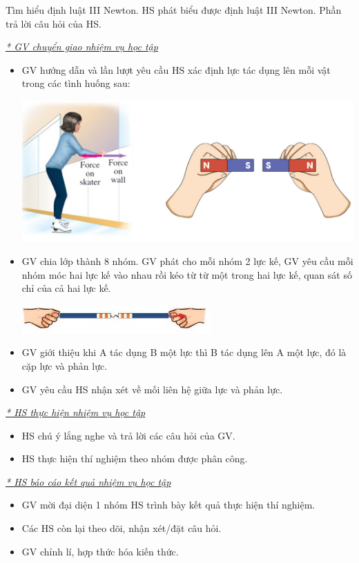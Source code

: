 \hoatdong
{Tìm hiểu định luật III Newton.
}
{HS phát biểu được định luật III Newton.
}
{Phần trả lời câu hỏi của HS.
}
{\textit{\underline{* GV chuyển giao nhiệm vụ học tập}}\\
	\begin{itemize}[label=-]
		\item GV hướng dẫn và lần lượt yêu cầu HS xác định lực tác dụng lên mỗi vật trong các tình huống sau:
		\begin{center}
			\includegraphics[scale=0.4]{figs/G10-BAI10-10}
		\end{center}
		\item GV chia lớp thành 8 nhóm. GV phát cho mỗi nhóm 2 lực kế, GV yêu cầu mỗi nhóm móc hai lực kế vào nhau rồi kéo từ từ một trong hai lực kế, quan sát số chỉ của cả hai lực kế. 
		\begin{center}
			\includegraphics{figs/G10-BAI10-11}
		\end{center}
		\item GV giới thiệu khi A tác dụng B một lực thì B tác dụng lên A một lực, đó là cặp lực và phản lực.
		\item GV yêu cầu HS nhận xét về mối liên hệ giữa lực và phản lực.
	\end{itemize}
	\textit{\underline{* HS thực hiện nhiệm vụ học tập}}
	\begin{itemize}[label=-]
		\item HS chú ý lắng nghe và trả lời các câu hỏi của GV.
		\item HS thực hiện thí nghiệm theo nhóm được phân công.
	\end{itemize}
	\textit{\underline{* HS báo cáo kết quả nhiệm vụ học tập}}
	\begin{itemize}[label=-]
		\item GV mời đại diện 1 nhóm HS trình bày kết quả thực hiện thí nghiệm.
		\item Các HS còn lại theo dõi, nhận xét/đặt câu hỏi.
		\item GV chỉnh lí, hợp thức hóa kiến thức.
	\end{itemize}
}
